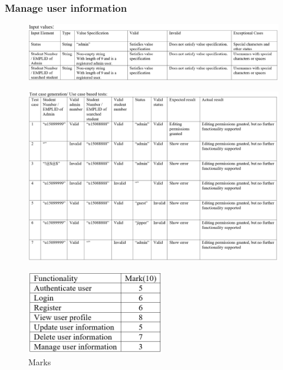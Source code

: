 \documentclass[english]{article}
\begin{document}
\subsubsection{Manage user information}
\begin{figure}[ht!]
\hspace*{-2.5cm}
\includegraphics[width=180mm]{13.png}
\end{figure}
\begin{figure}[ht!]
\hspace*{-2.5cm}
\includegraphics[width=180mm]{14.png}
\end{figure}
\clearpage
\begin{figure}[ht!]
\center
\includegraphics[width=60mm]{Marks.png}
\caption{Marks}
\end{figure}
\end{document}
